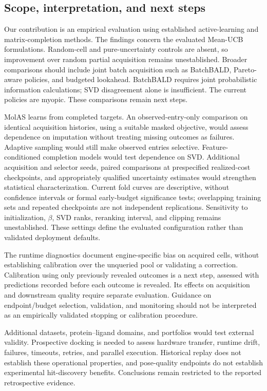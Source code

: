 \subsection{Scope, interpretation, and next steps}
\label{app:next-steps}

Our contribution is an empirical evaluation using established active-learning and matrix-completion methods. The findings concern the evaluated Mean-UCB formulations. Random-cell and pure-uncertainty controls are absent, so improvement over random partial acquisition remains unestablished. Broader comparisons should include joint batch acquisition such as BatchBALD, Pareto-aware policies, and budgeted lookahead. BatchBALD requires joint probabilistic information calculations; SVD disagreement alone is insufficient. The current policies are myopic. These comparisons remain next steps.

MolAS learns from completed targets. An observed-entry-only comparison on identical acquisition histories, using a suitable masked objective, would assess dependence on imputation without treating missing outcomes as failures. Adaptive sampling would still make observed entries selective. Feature-conditioned completion models would test dependence on SVD. Additional acquisition and selector seeds, paired comparisons at prespecified realized-cost checkpoints, and appropriately qualified uncertainty estimates would strengthen statistical characterization. Current fold curves are descriptive, without confidence intervals or formal early-budget significance tests; overlapping training sets and repeated checkpoints are not independent replications. Sensitivity to initialization, $\beta$, SVD ranks, reranking interval, and clipping remains unestablished. These settings define the evaluated configuration rather than validated deployment defaults.

The runtime diagnostics document engine-specific bias on acquired cells, without establishing calibration over the unqueried pool or validating a correction. Calibration using only previously revealed outcomes is a next step, assessed with predictions recorded before each outcome is revealed. Its effects on acquisition and downstream quality require separate evaluation. Guidance on endpoint/budget selection, validation, and monitoring should not be interpreted as an empirically validated stopping or calibration procedure.

Additional datasets, protein--ligand domains, and portfolios would test external validity. Prospective docking is needed to assess hardware transfer, runtime drift, failures, timeouts, retries, and parallel execution. Historical replay does not establish these operational properties, and pose-quality endpoints do not establish experimental hit-discovery benefits. Conclusions remain restricted to the reported retrospective evidence.
